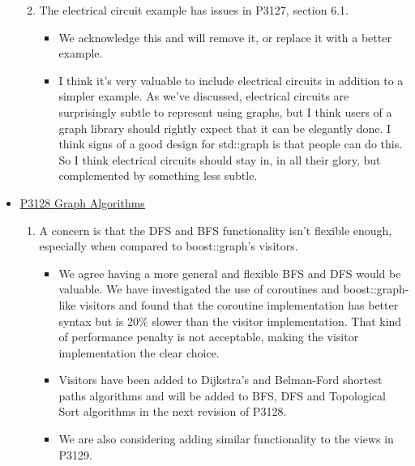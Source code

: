\begin{itemize}
\begin{enumerate}
\begin{itemize}
                        \end{itemize}
                  \item The electrical circuit example has issues in P3127, section 6.1.
                        \begin{itemize}
                              \item We acknowledge this and will remove it, or replace it with a better example.
                              \item I think it's very valuable to include electrical circuits in addition to a simpler example. As we've discussed, electrical 
                                    circuits are surprisingly subtle to represent using graphs, but I think users of a graph library should rightly expect that 
                                    it can be elegantly done. I think signs of a good design for std::graph is that people can do this. So I think electrical 
                                    circuits should stay in, in all their glory, but complemented by something less subtle. 
                        \end{itemize}
      \end{enumerate}
      \item \href{https://www.wg21.link/P3128}{P3128 Graph Algorithms}
            \begin{enumerate}
                  \item A concern is that the DFS and BFS functionality isn't flexible enough, especially when compared to boost::graph's visitors.
                        \begin{itemize}
                              \item We agree having a more general and flexible BFS and DFS would be valuable. We have investigated the use
                                    of coroutines and boost::graph-like visitors and found that the coroutine implementation has better
                                    syntax but is 20\% slower than the visitor implementation. That kind of performance penalty is not 
                                    acceptable, making the visitor implementation the clear choice.
                              \item Visitors have been added to Dijkstra's and Belman-Ford shortest paths algorithms and will be added 
                                    to BFS, DFS and Topological Sort algorithms in the next revision of P3128.
                              \item We are also considering adding similar functionality to the views in P3129.

\end{itemize}
\end{enumerate}
\end{itemize}
